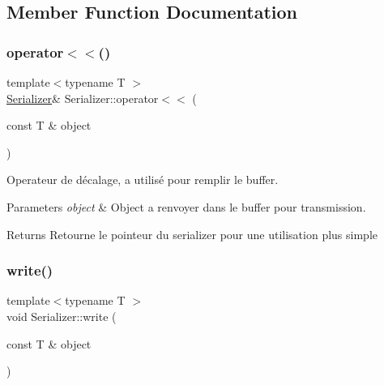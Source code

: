 \subsection{Member Function Documentation}
\mbox{\label{struct_serializer_a984119e4cc29ca38db4c193b70efe211}} 
\subsubsection{\texorpdfstring{operator$<$$<$()}{operator<<()}}
{\footnotesize\ttfamily template$<$typename T $>$ \\
\hyperlink{struct_serializer}{Serializer}\& Serializer\+::operator$<$$<$ (\begin{DoxyParamCaption}\item[{const T \&}]{object }\end{DoxyParamCaption})\hspace{0.3cm}{\ttfamily [inline]}}



Operateur de décalage, a utilisé pour remplir le buffer. 


\begin{DoxyParams}{Parameters}
{\em object} & Object a renvoyer dans le buffer pour transmission.\\
\hline
\end{DoxyParams}
\begin{DoxyReturn}{Returns}
Retourne le pointeur du serializer pour une utilisation plus simple 
\end{DoxyReturn}
\mbox{\label{struct_serializer_a1ee0f154ba82fc4cfb1bf596debc69d4}} 
\subsubsection{\texorpdfstring{write()}{write()}\hspace{0.1cm}{\footnotesize\ttfamily [1/3]}}
{\footnotesize\ttfamily template$<$typename T $>$ \\
void Serializer\+::write (\begin{DoxyParamCaption}\item[{const T \&}]{object }\end{DoxyParamCaption})\hspace{0.3cm}{\ttfamily [inline]}}



